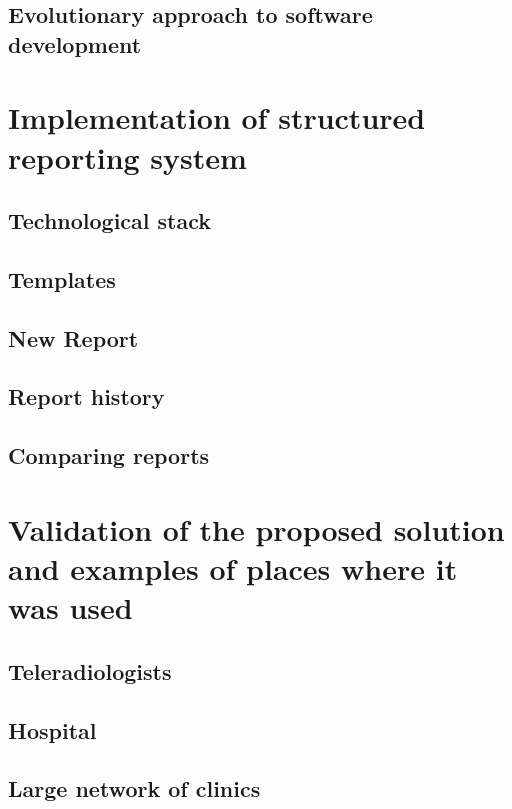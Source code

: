 \documentclass[12pt, twoside, openany]{report}
\theoremstyle{definition}
\begin{document}
\section{Evolutionary approach to software development}







\chapter{Implementation of structured reporting system}

\section{Technological stack}
\section{Templates}
\section{New Report}
\section{Report history}
\section{Comparing reports}






\chapter{Validation of the proposed solution and examples of places where it was used}
\section{Teleradiologists}

\section{Hospital}

\section{Large network of clinics}
\end{document}
